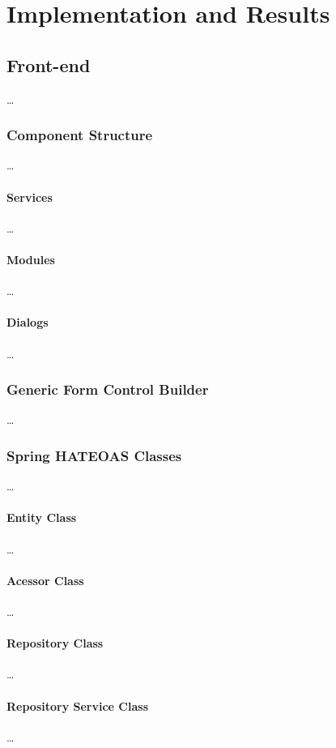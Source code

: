 \chapter{Implementation and Results}\label{cha:implementation}

\section{Front-end}\label{cha:implementation:sec:front-end}
\dots

\subsection{Component Structure}
\dots

\subsubsection{Services}
\dots
\subsubsection{Modules}
\dots
\subsubsection{Dialogs}
\dots
\subsection{Generic Form Control Builder}
\dots
\subsection{Spring HATEOAS Classes}
\dots
\subsubsection{Entity Class}
\dots
\subsubsection{Acessor Class}
\dots
\subsubsection{Repository Class}
\dots
\subsubsection{Repository Service Class}
\dots
